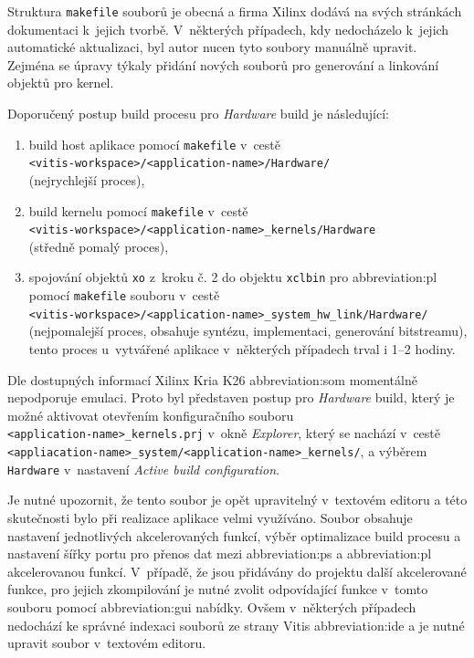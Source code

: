 \documentclass[a4paper, twoside, 11pt]{article}
\begin{document}
		Struktura \texttt{makefile} souborů je obecná a firma Xilinx dodává na svých stránkách dokumentaci k~jejich tvorbě. V~některých případech, kdy nedocházelo k~jejich automatické aktualizaci, byl autor nucen tyto soubory manuálně upravit. Zejména se úpravy týkaly přidání nových souborů pro generování a linkování objektů pro kernel.\par
		\vspace*{0.35cm}
		Doporučený postup build procesu pro \textit{Hardware} build je následující:
		\begin{enumerate}
			\item build host aplikace pomocí \texttt{makefile} v~cestě\\\texttt{<vitis-workspace>/<application-name>/Hardware/}\\(nejrychlejší proces),
			\item build kernelu pomocí \texttt{makefile} v~cestě\\\texttt{<vitis-workspace>/<application-name>\_kernels/Hardware}\\(středně pomalý proces),
			\item spojování objektů \texttt{xo} z~kroku č. 2 do objektu \texttt{xclbin} pro \gls{abbreviation:pl} pomocí \texttt{makefile} souboru v~cestě\\\texttt{<vitis-workspace>/<application-name>\_system\_hw\_link/Hardware/} (nejpomalejší proces, obsahuje syntézu, implementaci, generování bitstreamu), tento proces u~vytvářené aplikace v~některých případech trval i 1–2 hodiny.
		\end{enumerate}
		\vspace*{0.75cm}
		Dle dostupných informací Xilinx Kria K26 \gls{abbreviation:som} momentálně nepodporuje emulaci. Proto byl představen postup pro \textit{Hardware} build, který je možné aktivovat otevřením konfiguračního souboru \\\texttt{<application-name>\_kernels.prj} v~okně \textit{Explorer}, který se nachází v~cestě\\\texttt{<appliacation-name>\_system/<application-name>\_kernels/}, a výběrem \texttt{Hardware} v~nastavení \textit{Active build configuration}.\par
		Je nutné upozornit, že tento soubor je opět upravitelný v~textovém editoru a této skutečnosti bylo při realizace aplikace velmi využíváno. Soubor obsahuje nastavení jednotlivých akcelerovaných funkcí, výběr optimalizace build procesu a nastavení šířky portu pro přenos dat mezi \gls{abbreviation:ps} a \gls{abbreviation:pl} akcelerovanou funkcí. V~případě, že jsou přidávány do projektu další akcelerované funkce, pro jejich zkompilování je nutné zvolit odpovídající funkce v~tomto souboru pomocí \gls{abbreviation:gui} nabídky. Ovšem v~některých případech nedochází ke správné indexaci souborů ze strany Vitis \gls{abbreviation:ide} a je nutné upravit soubor v~textovém editoru.\par
\end{document}
